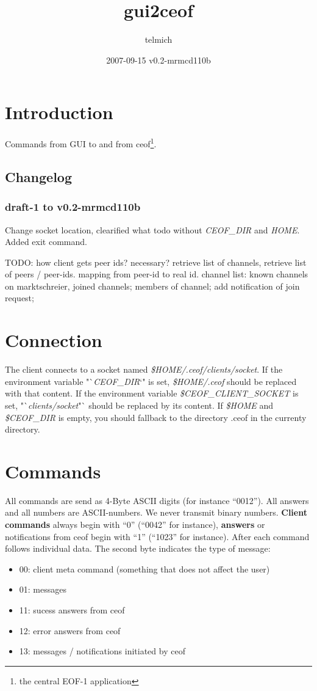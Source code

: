 \documentclass[12pt,a4paper]{article}
\begin{document}
\title{gui2ceof}
\date{2007-09-15 v0.2-mrmcd110b}
\author{telmich}

\maketitle
\tableofcontents

\section{Introduction}
Commands from GUI to and from
ceof\footnote{the central EOF-1 application}.

\subsection{Changelog}
\subsubsection{draft-1 to v0.2-mrmcd110b}
Change socket location, clearified what todo without
\textit{CEOF\_DIR} and \textit{HOME}. Added exit command.

TODO: how client gets peer ids? necessary? retrieve list of channels, retrieve
list of peers / peer-ids.  mapping from peer-id to real id. channel list: known
channels on marktschreier, joined channels; members of channel; add notification
of join request;

\section{Connection}
The client connects to a socket named \textit{\$HOME/.ceof/clients/socket}.
If the environment variable "`\textit{CEOF\_DIR}`" is set,
\textit{\$HOME/.ceof} should be replaced with that content.
If the environment variable \textit{\$CEOF\_CLIENT\_SOCKET} is set,
"`\textit{clients/socket}"` should be replaced by its content.
If \textit{\$HOME} and \textit{\$CEOF\_DIR} is empty, you should fallback
 to the directory .ceof in the currenty directory.

\section{Commands}
All commands are send as 4-Byte ASCII digits (for instance "`0012"').
All answers and all numbers are ASCII-numbers. We never transmit binary numbers.
\textbf{Client commands} always begin with "`0"' ("`0042"' for instance),
\textbf{answers} or notifications from ceof begin with "`1"' ("`1023"' for instance).
 After each command follows individual data. The second byte indicates the type of message:
\begin{itemize}
\item 00: client meta command (something that does not affect the user)
\item 01: messages
\item 11: sucess answers from ceof
\item 12: error answers from ceof
\item 13: messages / notifications initiated by ceof
\end{itemize}
\end{document}
